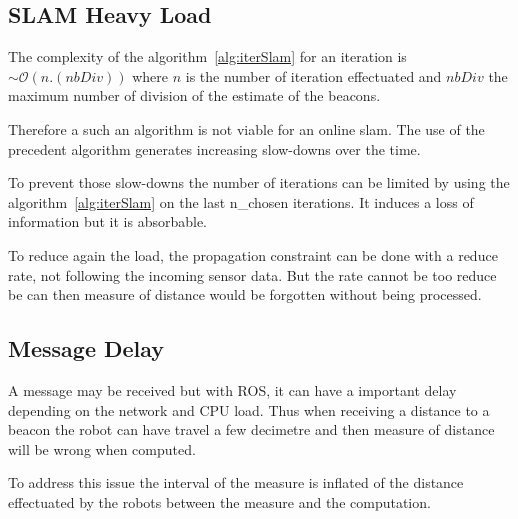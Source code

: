 \subsection{SLAM Heavy Load}

The complexity of the algorithm~\ref{alg:iterSlam} for an iteration is $\sim\mathcal{O}(n.(nbDiv))$ where $n$ is the number of iteration effectuated and $nbDiv$ the maximum number of division of the estimate of the beacons.

Therefore a such an algorithm is not viable for an online slam. The use of the precedent algorithm  generates increasing slow-downs over the time.

To prevent those slow-downs the number of iterations can be limited by using the algorithm~\ref{alg:iterSlam} on the last n\_chosen iterations. It induces a loss of information but it is absorbable.

To reduce again the load, the propagation constraint can be done with a reduce rate, not following the incoming sensor data. But the rate cannot be too reduce be can then measure of distance would be forgotten without being processed.

\subsection{Message Delay}\label{ssec:delaycompProb}

A message may be received but with ROS, it can have a important delay depending on the network and CPU load. Thus when receiving a distance to a beacon the robot can have travel a few decimetre and then measure of distance will be wrong when computed.

To address this issue the interval of the measure is inflated of the distance effectuated by the robots between the measure and the computation. 